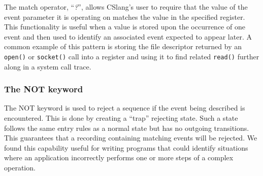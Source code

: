 The match operator, ``\textit{?}'', allows CSlang's user to
require that the value of the event parameter it is operating on matches
the value in the specified register.  This functionality is
useful when a value is stored upon the occurrence of one event
and then used to identify an associated event expected to appear later.
A common example of this pattern is storing the file descriptor
returned by an {\tt open()} or {\tt socket()} call into a register
and using it to find related {\tt read()} further along in a system call
trace.

\subsubsection{The NOT keyword}
\label{subsub:NOT}

The NOT keyword is used to reject a sequence if the event being
described is encountered.  This is done by creating a ``trap''
rejecting state.  Such a state follows the same entry rules
as a normal state but has no outgoing transitions.  This guarantees that a
recording containing matching events will be rejected.
We found this capability useful for writing programs that could identify
situations where an application incorrectly performs one or more steps of a
complex operation.




